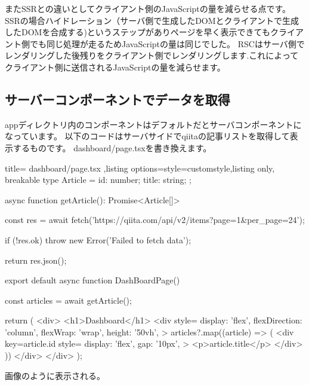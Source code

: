 またSSRとの違いとしてクライアント側のJavaScriptの量を減らせる点です。
SSRの場合ハイドレーション（サーバ側で生成したDOMとクライアントで生成したDOMを合成する)というステップがありページを早く表示できてもクライアント側でも同じ処理が走るためJavaScriptの量は同じでした。
RSCはサーバ側でレンダリングした後残りをクライアント側でレンダリングします.これによってクライアント側に送信されるJavaScriptの量を減らせます。


\subsection{サーバーコンポーネントでデータを取得}


appディレクトリ内のコンポーネントはデフォルトだとサーバコンポーネントになっています。
以下のコードはサーバサイドでqiitaの記事リストを取得して表示するものです。
dashboard/page.tsxを書き換えます。



\begin{tcblisting}{title={
        dashboard/page.tsx
      },listing options={style=customstyle},listing only, breakable}
  type Article = {
    id: number;
    title: string;
  };

  async function getArticle(): Promise<Article[]> {
    const res = await fetch('https://qiita.com/api/v2/items?page=1&per_page=24');

    if (!res.ok) {
        throw new Error('Failed to fetch data');
    }

    return res.json();
  }

  export default async function DashBoardPage() {
    const articles = await getArticle();

    return (
      <div>
        <h1>Dashboard</h1>
        <div
        style={{
            display: 'flex',
            flexDirection: 'column',
            flexWrap: 'wrap',
            height: '50vh',
          }}
        >
          {articles?.map((article) => (
            <div
            key={article.id}
            style={{
                display: 'flex',
                gap: '10px',
              }}
            >
              <p>{article.title}</p>
            </div>
            ))}
        </div>
      </div>
    );
  }


\end{tcblisting}






画像のように表示される。

